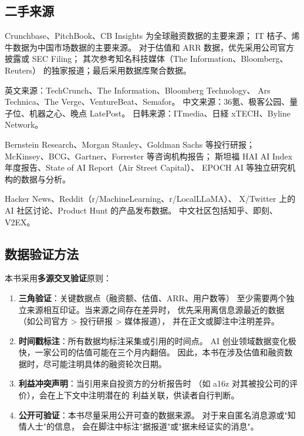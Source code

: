 \subsection{二手来源}

\begin{description}[style=nextline, leftmargin=1em]

\item[融资与估值数据]
Crunchbase、PitchBook、CB Insights 为全球融资数据的主要来源；
IT 桔子、烯牛数据为中国市场数据的主要来源。
对于估值和 ARR 数据，优先采用公司官方披露或 SEC Filing；
其次参考知名科技媒体（The Information、Bloomberg、Reuters）
的独家报道；最后采用数据库聚合数据。

\item[科技媒体]
英文来源：TechCrunch、The Information、Bloomberg Technology、
Ars Technica、The Verge、VentureBeat、Semafor。
中文来源：36氪、极客公园、量子位、机器之心、晚点 LatePost。
日韩来源：ITmedia、日経 xTECH、Byline Network。

\item[研究报告]
Bernstein Research、Morgan Stanley、Goldman Sachs 等投行研报；
McKinsey、BCG、Gartner、Forrester 等咨询机构报告；
斯坦福 HAI AI Index 年度报告、State of AI Report（Air Street Capital）、
EPOCH AI 等独立研究机构的数据与分析。

\item[社区与论坛]
Hacker News、Reddit（r/MachineLearning、r/LocalLLaMA）、
X/Twitter 上的 AI 社区讨论、Product Hunt 的产品发布数据。
中文社区包括知乎、即刻、V2EX。

\end{description}

\subsection{数据验证方法}

本书采用\textbf{多源交叉验证}原则：

\begin{enumerate}
  \item \textbf{三角验证}：关键数据点（融资额、估值、ARR、用户数等）
    至少需要两个独立来源相互印证。当来源之间存在差异时，
    优先采用离信息源最近的数据（如公司官方 > 投行研报 > 媒体报道），
    并在正文或脚注中注明差异。

  \item \textbf{时间戳标注}：所有数据均标注采集或引用的时间点。
    AI 创业领域数据变化极快，一家公司的估值可能在三个月内翻倍。
    因此，本书在涉及估值和融资数据时，尽可能注明具体的融资轮次日期。

  \item \textbf{利益冲突声明}：当引用来自投资方的分析报告时
    （如 a16z 对其被投公司的评价），会在上下文中注明潜在的
    利益关联，供读者自行判断。

  \item \textbf{公开可验证}：本书尽量采用公开可查的数据来源。
    对于来自匿名消息源或"知情人士"的信息，
    会在脚注中标注"据报道"或"据未经证实的消息"。
\end{enumerate}

